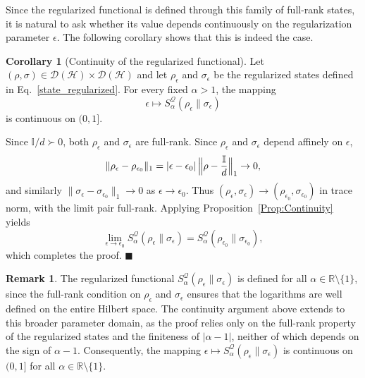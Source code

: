 \documentclass[a4paper, amsfonts, amssymb, amsmath, reprint, showkeys, nofootinbib, twoside, aps, pra]{revtex4-2}
\theoremstyle{definition}
\newtheorem{corollary}[theorem]{Corollary}
\newtheorem{remark}{Remark}
\renewenvironment{proof}{\noindent{\bfseries Proof.}}{\hfill$\blacksquare$}
\begin{document}
Since the regularized functional is defined through
this family of full-rank states, it is natural to ask whether its value depends
continuously on the regularization parameter
\(\epsilon\). The following corollary shows that this is indeed the case.

\begin{corollary}[Continuity of the regularized functional]
\label{Prop:RegularizedContinuity}
Let $(\rho,\sigma)\in \mathcal{D}(\mathcal{H})\times \mathcal{D}(\mathcal{H})$
and let $\rho_\epsilon$ and $\sigma_\epsilon$ be the regularized states defined
in Eq.~\eqref{state_regularized}.
For every fixed $\alpha > 1$, the mapping
\[
  \epsilon \longmapsto S_\alpha^{\mathcal{Q}}(\rho_\epsilon\|\sigma_\epsilon)
\]
is continuous on $(0,1]$.
\end{corollary}

\begin{proof}
Since ${\mathbb{I}}/d \succ 0$, both $\rho_\epsilon$ and $\sigma_\epsilon$ are full-rank.
Since $\rho_\epsilon$ and $\sigma_\epsilon$ depend affinely on $\epsilon$,
\[
  \|\rho_\epsilon - \rho_{\epsilon_0}\|_1
  = |\epsilon - \epsilon_0|\,\Bigl\|\rho - \frac{{\mathbb{I}}}{d}\Bigr\|_1 \to 0,
\]
and similarly $\|\sigma_\epsilon - \sigma_{\epsilon_0}\|_1 \to 0$ as
$\epsilon \to \epsilon_0$. Thus
$(\rho_\epsilon, \sigma_\epsilon) \to (\rho_{\epsilon_0}, \sigma_{\epsilon_0})$
in trace norm, with the limit pair full-rank.
Applying Proposition~\ref{Prop:Continuity} yields
\[
  \lim_{\epsilon \to \epsilon_0}
  S_\alpha^{\mathcal{Q}}(\rho_\epsilon \| \sigma_\epsilon)
  = S_\alpha^{\mathcal{Q}}(\rho_{\epsilon_0} \| \sigma_{\epsilon_0}),
\]
which completes the proof.
\end{proof}

\begin{remark}
The regularized functional $S_\alpha^{\mathcal{Q}}(\rho_\epsilon\|\sigma_\epsilon)$
is defined for all $\alpha \in \mathbb{R} \setminus \{1\}$, since the full-rank
condition on $\rho_\epsilon$ and $\sigma_\epsilon$ ensures that the logarithms
are well defined on the entire Hilbert space. The continuity argument above
extends to this broader parameter domain, as the proof relies only on the
full-rank property of the regularized states and the finiteness of $|\alpha-1|$,
neither of which depends on the sign of $\alpha - 1$. Consequently, the mapping
$\epsilon \mapsto S_\alpha^{\mathcal{Q}}(\rho_\epsilon\|\sigma_\epsilon)$
is continuous on $(0,1]$ for all $\alpha \in \mathbb{R} \setminus \{1\}$.
\end{remark}
\end{document}
